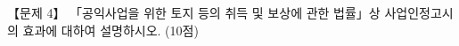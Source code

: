 \begin{longquestion}{【문제 4】}
「공익사업을 위한 토지 등의 취득 및 보상에 관한 법률」상 사업인정고시의 효과에 대하여 설명하시오. (10점) \par
\end{longquestion}
